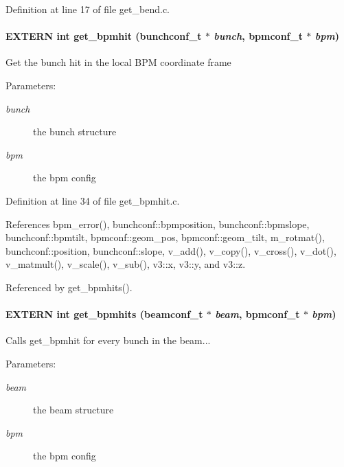 Definition at line 17 of file get\_\-bend.c.
\paragraph[get\_\-bpmhit]{\setlength{\rightskip}{0pt plus 5cm}EXTERN int get\_\-bpmhit ({\bf bunchconf\_\-t} $\ast$ {\em bunch}, \/  {\bf bpmconf\_\-t} $\ast$ {\em bpm})}\hfill\label{group__orbit_g8d1844c98e078a204eba6e1930464c0c}


Get the bunch hit in the local BPM coordinate frame \begin{Desc}
\item[Parameters:]
\begin{description}
\item[{\em bunch}]the bunch structure \item[{\em bpm}]the bpm config \end{description}
\end{Desc}


Definition at line 34 of file get\_\-bpmhit.c.

References bpm\_\-error(), bunchconf::bpmposition, bunchconf::bpmslope, bunchconf::bpmtilt, bpmconf::geom\_\-pos, bpmconf::geom\_\-tilt, m\_\-rotmat(), bunchconf::position, bunchconf::slope, v\_\-add(), v\_\-copy(), v\_\-cross(), v\_\-dot(), v\_\-matmult(), v\_\-scale(), v\_\-sub(), v3::x, v3::y, and v3::z.

Referenced by get\_\-bpmhits().
\paragraph[get\_\-bpmhits]{\setlength{\rightskip}{0pt plus 5cm}EXTERN int get\_\-bpmhits ({\bf beamconf\_\-t} $\ast$ {\em beam}, \/  {\bf bpmconf\_\-t} $\ast$ {\em bpm})}\hfill\label{group__orbit_g0120d351d159676f9630cd633419ddd2}


Calls get\_\-bpmhit for every bunch in the beam... \begin{Desc}
\item[Parameters:]
\begin{description}
\item[{\em beam}]the beam structure \item[{\em bpm}]the bpm config \end{description}
\end{Desc}


